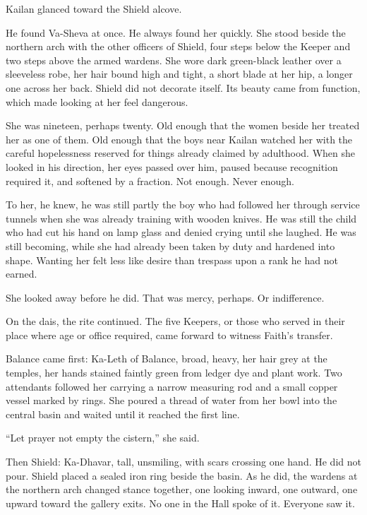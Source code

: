 Kailan glanced toward the Shield alcove.\par

He found Va-Sheva at once. He always found her quickly. She stood beside the northern arch with the other officers of Shield, four steps below the Keeper and two steps above the armed wardens. She wore dark green-black leather over a sleeveless robe, her hair bound high and tight, a short blade at her hip, a longer one across her back. Shield did not decorate itself. Its beauty came from function, which made looking at her feel dangerous.\par

She was nineteen, perhaps twenty. Old enough that the women beside her treated her as one of them. Old enough that the boys near Kailan watched her with the careful hopelessness reserved for things already claimed by adulthood. When she looked in his direction, her eyes passed over him, paused because recognition required it, and softened by a fraction. Not enough. Never enough.\par

To her, he knew, he was still partly the boy who had followed her through service tunnels when she was already training with wooden knives. He was still the child who had cut his hand on lamp glass and denied crying until she laughed. He was still becoming, while she had already been taken by duty and hardened into shape. Wanting her felt less like desire than trespass upon a rank he had not earned.\par

She looked away before he did. That was mercy, perhaps. Or indifference.\par

On the dais, the rite continued. The five Keepers, or those who served in their place where age or office required, came forward to witness Faith’s transfer.\par

Balance came first: Ka-Leth of Balance, broad, heavy, her hair grey at the temples, her hands stained faintly green from ledger dye and plant work. Two attendants followed her carrying a narrow measuring rod and a small copper vessel marked by rings. She poured a thread of water from her bowl into the central basin and waited until it reached the first line.\par

“Let prayer not empty the cistern,” she said.\par

Then Shield: Ka-Dhavar, tall, unsmiling, with scars crossing one hand. He did not pour. Shield placed a sealed iron ring beside the basin. As he did, the wardens at the northern arch changed stance together, one looking inward, one outward, one upward toward the gallery exits. No one in the Hall spoke of it. Everyone saw it.\par

